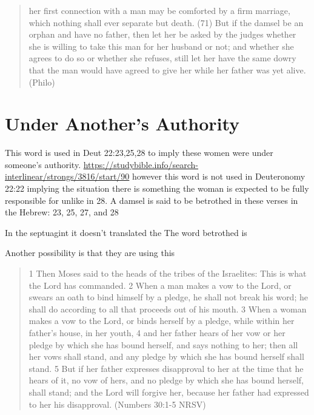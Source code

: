 \documentclass[11pt]{article}
\begin{document}
\begin{quote}
her first connection with a man may be comforted by a firm marriage, which nothing shall ever separate but death. (71) But if the damsel be an orphan and have no father, then let her be asked by the judges whether she is willing to take this man for her husband or not; and whether she agrees to do so or whether she refuses, still let her have the same dowry that the man would have agreed to give her while her father was yet alive.
(Philo)
\end{quote}

\section{Under Another's Authority}

This word is used in Deut 22:23,25,28 to imply these women were under someone’s authority. \url{https://studybible.info/search-interlinear/strongs/3816/start/90} however this word is not used in Deuteronomy 22:22 implying the situation there is something the woman is expected to be fully responsible for unlike in 28. A damsel is said to be betrothed in these verses in the Hebrew:
23, 25, 27, and 28

In the septuagint it doesn't translated the 
The word betrothed is 

Another possibility is that they are using this 

\begin{quote}
1 Then Moses said to the heads of the tribes of the Israelites: This is what the Lord has commanded. 2 When a man makes a vow to the Lord, or swears an oath to bind himself by a pledge, he shall not break his word; he shall do according to all that proceeds out of his mouth.
3 When a woman makes a vow to the Lord, or binds herself by a pledge, while within her father’s house, in her youth, 4 and her father hears of her vow or her pledge by which she has bound herself, and says nothing to her; then all her vows shall stand, and any pledge by which she has bound herself shall stand. 5 But if her father expresses disapproval to her at the time that he hears of it, no vow of hers, and no pledge by which she has bound herself, shall stand; and the Lord will forgive her, because her father had expressed to her his disapproval. (Numbers 30:1-5 NRSV)
\end{quote}
\end{document}
